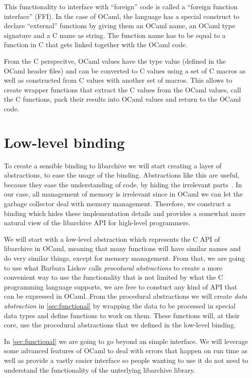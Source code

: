 \documentclass[parskip=half]{scrreprt}
\newcommand\inline[1]{{\addfontfeature{Letters=SmallCaps}#1}}
\begin{document}
This functionality to interface with \enquote{foreign} code is called a
\enquote{foreign function interface} (FFI). In the case of OCaml, the language
has a special construct to declare \enquote{external} functions by giving them
an OCaml name, an OCaml type signature and a C name as string. The function
name has to be equal to a function in C that gets linked together with the
OCaml code.

From the C perspecitve, OCaml values have the type \inline{value} (defined in
the OCaml header files) and can be converted to C values using a set of C
macros as well as constructed from C values with another set of macros. This
allows to create wrapper functions that extract the C values from the OCaml
values, call the C functions, pack their results into OCaml values and return
to the OCaml code.

\section{Low-level binding}
\label{sec:lowlevel}

To create a sensible binding to libarchive we will start creating a layer of
abstractions, to ease the usage of the binding. Abstractions like this are
useful, because they ease the understanding of code, by hiding the irrelevant
parts~\cite[p.~7]{liskov1986abstraction}. In our case, all management of memory
is irrelevant since in OCaml we can let the garbage collector deal with memory
management.  Therefore, we construct a binding which hides these implementation
details and provides a somewhat more natural view of the libarchive API for
high-level programmers.

We will start with a low-level abstraction which represents the C API of
libarchive in OCaml, meaning that many functions will have similar names and do
very similar things, except for memory management. From that, we are going to
use what Barbara Liskov calls \emph{procedural abstractions} to create a more
convenient way to use the functionality that is not limited by what the C
programming language supports, we are free to constuct any kind of API that can
be expressed in OCaml. From the procedural abstractions we will create
\emph{data abstraction} in \autoref{sec:functional} by wrapping the data to be
processed in special data types and define functions to work on them. These
functions will, at their core, use the procedural abstractions that we defined
in the low-level binding.

In \autoref{sec:functional} we are going to go beyond an simple interface. We
will leverage some advanced features of OCaml to deal with errors that happen
on run time as well as provide a vastly easier interface so people wanting to
use it do not need to understand the functionality of the unterlying libarchive
library.
\end{document}
